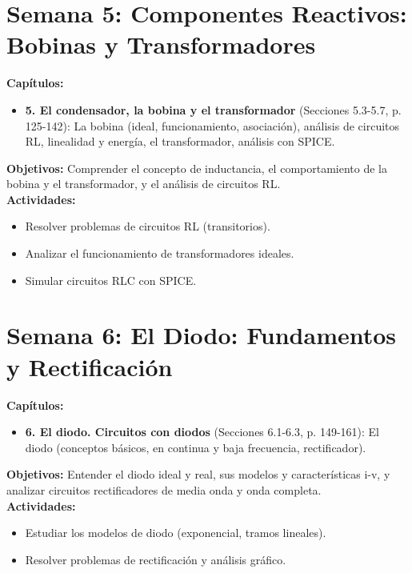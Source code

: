 \documentclass[12pt, a4paper]{article}
\begin{document}
\section{Semana 5: Componentes Reactivos: Bobinas y Transformadores}
\textbf{Capítulos:}
\begin{itemize}
    \item \textbf{5. El condensador, la bobina y el transformador} (Secciones 5.3-5.7, p. 125-142): La bobina (ideal, funcionamiento, asociación), análisis de circuitos RL, linealidad y energía, el transformador, análisis con SPICE.
\end{itemize}
\textbf{Objetivos:} Comprender el concepto de inductancia, el comportamiento de la bobina y el transformador, y el análisis de circuitos RL.\\
\textbf{Actividades:}
\begin{itemize}
    \item Resolver problemas de circuitos RL (transitorios).
    \item Analizar el funcionamiento de transformadores ideales.
    \item Simular circuitos RLC con SPICE.
\end{itemize}

\section{Semana 6: El Diodo: Fundamentos y Rectificación}
\textbf{Capítulos:}
\begin{itemize}
    \item \textbf{6. El diodo. Circuitos con diodos} (Secciones 6.1-6.3, p. 149-161): El diodo (conceptos básicos, en continua y baja frecuencia, rectificador).
\end{itemize}
\textbf{Objetivos:} Entender el diodo ideal y real, sus modelos y características i-v, y analizar circuitos rectificadores de media onda y onda completa.\\
\textbf{Actividades:}
\begin{itemize}
    \item Estudiar los modelos de diodo (exponencial, tramos lineales).
    \item Resolver problemas de rectificación y análisis gráfico.
\end{itemize}
\end{document}
